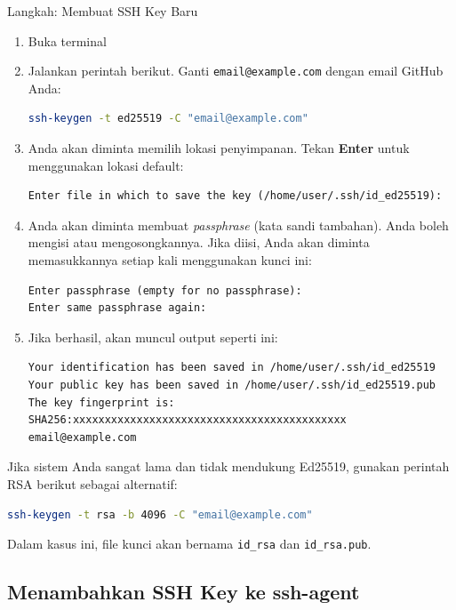 \documentclass[
    a4paper,
    11pt,
    parskip=half
]{scrartcl}
\begin{document}
\begin{stepbox}{Langkah: Membuat SSH Key Baru}
\begin{enumerate}
    \item Buka terminal
    \item Jalankan perintah berikut. Ganti \texttt{email@example.com} dengan email GitHub Anda:

\begin{lstlisting}[language=bash]
ssh-keygen -t ed25519 -C "email@example.com"
\end{lstlisting}

    \item Anda akan diminta memilih lokasi penyimpanan. Tekan \textbf{Enter} untuk menggunakan lokasi default:
\begin{lstlisting}
Enter file in which to save the key (/home/user/.ssh/id_ed25519):
\end{lstlisting}

    \item Anda akan diminta membuat \textit{passphrase} (kata sandi tambahan). Anda boleh mengisi atau mengosongkannya. Jika diisi, Anda akan diminta memasukkannya setiap kali menggunakan kunci ini:
\begin{lstlisting}
Enter passphrase (empty for no passphrase):
Enter same passphrase again:
\end{lstlisting}

    \item Jika berhasil, akan muncul output seperti ini:
\begin{lstlisting}
Your identification has been saved in /home/user/.ssh/id_ed25519
Your public key has been saved in /home/user/.ssh/id_ed25519.pub
The key fingerprint is:
SHA256:xxxxxxxxxxxxxxxxxxxxxxxxxxxxxxxxxxxxxxxxxxx email@example.com
\end{lstlisting}
\end{enumerate}
\end{stepbox}

\begin{notebox}
Jika sistem Anda sangat lama dan tidak mendukung Ed25519, gunakan perintah RSA berikut sebagai alternatif:
\begin{lstlisting}[language=bash]
ssh-keygen -t rsa -b 4096 -C "email@example.com"
\end{lstlisting}
Dalam kasus ini, file kunci akan bernama \texttt{id\_rsa} dan \texttt{id\_rsa.pub}.
\end{notebox}

\subsection{Menambahkan SSH Key ke ssh-agent}
\label{sec:ssh-agent}
\end{document}
